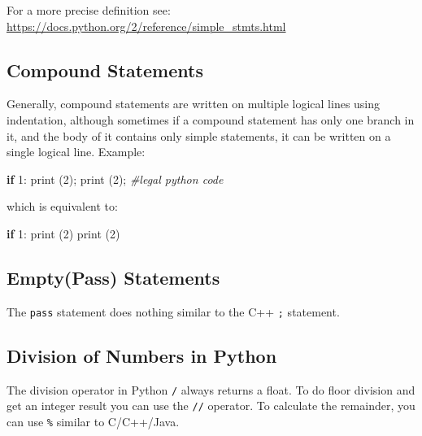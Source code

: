 \documentclass[
]{article}
\newenvironment{Shaded}{}{}
\newcommand{\BuiltInTok}[1]{#1}
\newcommand{\CommentTok}[1]{\textcolor[rgb]{0.38,0.63,0.69}{\textit{#1}}}
\newcommand{\ControlFlowTok}[1]{\textcolor[rgb]{0.00,0.44,0.13}{\textbf{#1}}}
\newcommand{\DecValTok}[1]{\textcolor[rgb]{0.25,0.63,0.44}{#1}}
\newcommand{\NormalTok}[1]{#1}
\newcommand{\OperatorTok}[1]{\textcolor[rgb]{0.40,0.40,0.40}{#1}}
\begin{document}
For a more precise definition see:
\url{https://docs.python.org/2/reference/simple_stmts.html}

\hypertarget{compound-statements}{%
\subsection{Compound Statements}\label{compound-statements}}

Generally, compound statements are written on multiple logical lines
using indentation, although sometimes if a compound statement has only
one branch in it, and the body of it contains only simple statements, it
can be written on a single logical line. Example:

\begin{Shaded}
\begin{Highlighting}[]
\ControlFlowTok{if} \DecValTok{1}\NormalTok{: }\BuiltInTok{print}\NormalTok{ (}\DecValTok{2}\NormalTok{)}\OperatorTok{;} \BuiltInTok{print}\NormalTok{ (}\DecValTok{2}\NormalTok{)}\OperatorTok{;} \CommentTok{\#legal python code}
\end{Highlighting}
\end{Shaded}

which is equivalent to:

\begin{Shaded}
\begin{Highlighting}[]
\ControlFlowTok{if} \DecValTok{1}\NormalTok{:}
    \BuiltInTok{print}\NormalTok{ (}\DecValTok{2}\NormalTok{)}
    \BuiltInTok{print}\NormalTok{ (}\DecValTok{2}\NormalTok{)}
\end{Highlighting}
\end{Shaded}

\hypertarget{emptypass-statements}{%
\subsection{Empty(Pass) Statements}\label{emptypass-statements}}

The \texttt{pass} statement does nothing similar to the C++ \texttt{;}
statement.

\hypertarget{division-of-numbers-in-python}{%
\subsection{Division of Numbers in
Python}\label{division-of-numbers-in-python}}

The division operator in Python \texttt{/} always returns a float. To do
floor division and get an integer result you can use the \texttt{//}
operator. To calculate the remainder, you can use \texttt{\%} similar to
C/C++/Java.
\end{document}
